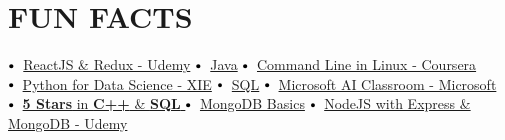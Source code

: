\documentclass[letterpaper,11pt]{article}
\newcommand\sbullet[1][.5]{\mathbin{\vcenter{\hbox{\scalebox{#1}{$\bullet$}}}}}
\begin{document}


\section{FUN FACTS}

$\sbullet[.75] \hspace{0.1cm}$ {\href{certificateLink.com}{ReactJS \& Redux - Udemy}} \hspace{1.6cm}
$\sbullet[.75] \hspace{0.1cm}$ {\href{certificateLink.com}{Java}} \hspace{2.59cm}
$\sbullet[.75] \hspace{0.2cm}${\href{certificateLink.com} {Command Line in Linux - Coursera}}\\

$\sbullet[.75] \hspace{0.2cm}${\href{certificateLink.com}{Python for Data Science - XIE}} \hspace{1cm}
$\sbullet[.75] \hspace{0.1cm}$ {\href{certificateLink.com}{SQL}} \hspace{2.6cm}
$\sbullet[.75] \hspace{0.2cm}${\href{certificateLink.com}{Microsoft AI Classroom - Microsoft}} \\

$\sbullet[.75] \hspace{0.2cm}${\href{certificateLink.com}{\textbf{5 Stars} in \textbf{C++} \& \textbf{SQL} \href{certificateLink.com}{\raisebox{-0.1\height}\faExternalLink }}}\hspace{1.45cm}
$\sbullet[.75] \hspace{0.2cm}${\href{certificateLink.com}{MongoDB Basics}} \hspace{0.5cm}
$\sbullet[.75] \hspace{0.2cm}${\href{certificateLink.com}{NodeJS with Express \& MongoDB - Udemy}} \\
\end{document}
